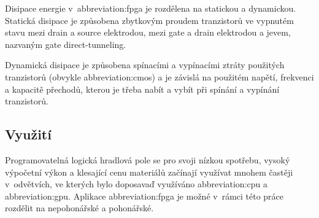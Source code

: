 \documentclass[a4paper, twoside, 11pt]{article}
\begin{document}
			Disipace energie v~\gls{abbreviation:fpga} je rozdělena na statickou a dynamickou. Statická disipace je způsobena zbytkovým proudem tranzistorů ve vypnutém stavu mezi drain a source elektrodou, mezi gate a drain elektrodou a jevem, nazvaným gate direct-tunneling. \cite{grover-reduction-of-power-consumption}\par
			Dynamická disipace je způsobena spínacími a vypínacími ztráty použitých tranzistorů (obvykle \gls{abbreviation:cmos}) a je závislá na použitém napětí, frekvenci a kapacitě přechodů, kterou je třeba nabít a vybít při spínání a vypínání tranzistorů. \cite{grover-reduction-of-power-consumption}


			
			\subsection{Využití}
			Programovatelná logická hradlová pole se pro svoji nízkou spotřebu, vysoký výpočetní výkon a klesající cenu materiálů začínají využívat mnohem častěji v~odvětvích, ve kterých bylo doposavaď využíváno \gls{abbreviation:cpu} a \gls{abbreviation:gpu}. Aplikace \gls{abbreviation:fpga} je možné v~rámci této práce rozdělit na nepohonářské a pohonářské.
\end{document}
